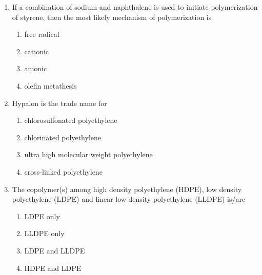 \documentclass[journal,12pt,onecolumn]{IEEEtran}
\begin{document}
\begin{enumerate}[label=\arabic*)]
\vspace{0.5cm}

\item If a combination of sodium and naphthalene is used to initiate polymerization of styrene, then the most likely mechanism of polymerization is
\hfill{} \\

\vspace{0.2cm}
\begin{enumerate}[label=\alph*)]
\item free radical
\item cationic
\item anionic
\item olefin metathesis
\end{enumerate}

\vspace{0.5cm}

\item Hypalon is the trade name for
\hfill{} \\

\vspace{0.2cm}
\begin{enumerate}[label=\alph*)]
\item chlorosulfonated polyethylene
\item chlorinated polyethylene
\item ultra high molecular weight polyethylene
\item cross-linked polyethylene
\end{enumerate}

\vspace{0.5cm}

\item The copolymer(s) among high density polyethylene (HDPE), low density polyethylene (LDPE) and linear low density polyethylene (LLDPE) is/are
\hfill{} \\

\vspace{0.2cm}
\begin{enumerate}[label=\alph*)]
\item LDPE only
\item LLDPE only
\item LDPE and LLDPE
\item HDPE and LDPE
\end{enumerate}

\vspace{0.5cm}


\end{enumerate}
\end{document}
